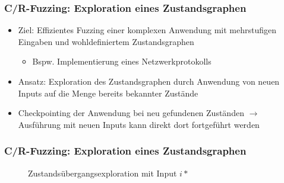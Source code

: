 \documentclass[handout]{beamer}
\begin{document}
\begin{frame}
    \frametitle{C/R-Fuzzing: Exploration eines Zustandsgraphen}
    \begin{itemize}
        \item Ziel: Effizientes Fuzzing einer komplexen Anwendung mit mehrstufigen Eingaben und wohldefiniertem Zustandsgraphen
            \begin{itemize}
                \item Bspw. Implementierung eines Netzwerkprotokolls
            \end{itemize}
        \item Ansatz: Exploration des Zustandsgraphen durch Anwendung von neuen Inputs auf die Menge bereits bekannter Zustände
        \item Checkpointing der Anwendung bei neu gefundenen Zuständen $\rightarrow$ Ausführung mit neuen Inputs kann direkt dort fortgeführt werden
    \end{itemize}
\end{frame}

\begin{frame}
    \frametitle{C/R-Fuzzing: Exploration eines Zustandsgraphen}
    \begin{figure}[h]
        \begin{center}
        \end{center}
        \caption{Zustandsübergangsexploration mit Input $i*$}
    \end{figure}
\end{frame}
\end{document}
